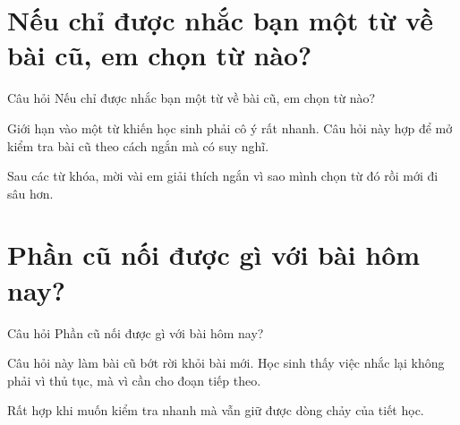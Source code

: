 \section{Nếu chỉ được nhắc bạn một từ về bài cũ, em chọn từ nào?}
\begin{cauhoibox}{Câu hỏi}
Nếu chỉ được nhắc bạn một từ về bài cũ, em chọn từ nào?
\end{cauhoibox}
\begin{taisaocoich}
Giới hạn vào một từ khiến học sinh phải cô ý rất nhanh. Câu hỏi này hợp để mở kiểm tra bài cũ theo cách ngắn mà có suy nghĩ.
\end{taisaocoich}
\begin{goiybien}
Sau các từ khóa, mời vài em giải thích ngắn vì sao mình chọn từ đó rồi mới đi sâu hơn.
\end{goiybien}
\ngancach

\section{Phần cũ nối được gì với bài hôm nay?}
\begin{cauhoibox}{Câu hỏi}
Phần cũ nối được gì với bài hôm nay?
\end{cauhoibox}
\begin{taisaocoich}
Câu hỏi này làm bài cũ bớt rời khỏi bài mới. Học sinh thấy việc nhắc lại không phải vì thủ tục, mà vì cần cho đoạn tiếp theo.
\end{taisaocoich}
\begin{goiybien}
Rất hợp khi muốn kiểm tra nhanh mà vẫn giữ được dòng chảy của tiết học.
\end{goiybien}
